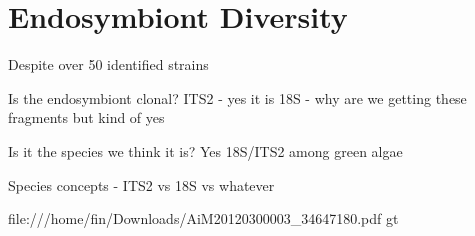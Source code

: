 % 
\graphicspath{{chapters/3.Chapter_1/figures}}

\chapter{Endosymbiont Diversity}


Despite over 50 identified strains 


Is the endosymbiont clonal?
ITS2 - yes it is
18S - why are we getting these fragments but kind of yes

Is it the species we think it is?
Yes 18S/ITS2 among green algae

Species concepts  - ITS2 vs 18S vs whatever \citep{Boenigk2012}

file:///home/fin/Downloads/AiM20120300003_34647180.pdf
gt
